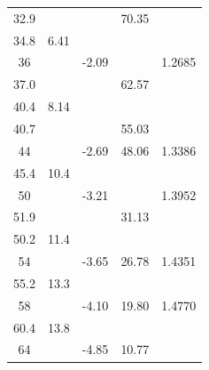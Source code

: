 \documentclass[]{tufte-handout}
\begin{document}
\begin{table}[h!]
\begin{tabular}{SSSSS}
        32.9               &                                  &               &   70.35       &                         \\
        34.8               &   6.41                        &            {} &            {}    &             {}           \\
        36                  &                                  & -2.09      &                   &             1.2685      \\
        37.0               &                                  &               &   62.57       &                         \\
        40.4               &   8.14                        &           {} &            {}     &              {}           \\
  	40.7              &                                   &              &  55.03         &                         \\
        44                 &                                   & -2.69     &  48.06         &             1.3386      \\
        45.4              &  10.4                          &           {} &            {}      &             {}           \\
        50                 &                                   & -3.21     &                     &             1.3952      \\
        51.9              &                                   &              &   31.13         &                         \\
        50.2              &  11.4                          &           {} &            {}      &             {}            \\
        54                 &                                   & -3.65     &   26.78         &             1.4351      \\
        55.2              &  13.3                          &           {} &            {}      &            {}             \\
        58                 &                                   & -4.10     &   19.80         &             1.4770      \\
        60.4              &  13.8                          &           {} &             {}     &             {}           \\
        64                 &                                   &  -4.85    &  10.77          &                         \\

\end{tabular}
\end{table}
\end{document}
